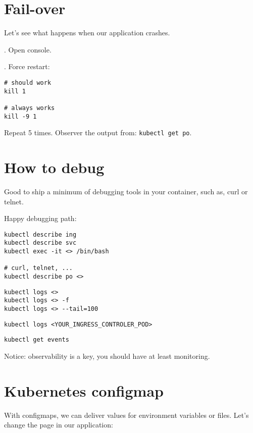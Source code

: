 \documentclass[12pt, letterpaper]{article}
\begin{document}
\bigskip
\bigskip

\section{Fail-over}
Let's see what happens when our application crashes.

. Open console.

. Force restart:

\begin{verbatim}
# should work
kill 1

# always works
kill -9 1
\end{verbatim}

Repeat 5 times. Observer the output from: \verb|kubectl get po|.

%
%
%
\section{How to debug}

Good to ship a minimum of debugging tools in your container, such as, curl or telnet.

Happy debugging path:

\begin{verbatim}
kubectl describe ing
kubectl describe svc
kubectl exec -it <> /bin/bash

# curl, telnet, ...
kubectl describe po <>
\end{verbatim}

\begin{verbatim}
kubectl logs <>
kubectl logs <> -f
kubectl logs <> --tail=100
\end{verbatim}

\begin{verbatim}
kubectl logs <YOUR_INGRESS_CONTROLER_POD>
\end{verbatim}

\begin{verbatim}
kubectl get events
\end{verbatim}

\bigskip
Notice: observability is a key, you should have at least monitoring.
%
%
%
\pagebreak
\section{Kubernetes configmap}

With configmaps, we can deliver values for environment variables or files. Let's change the page in our application:
\end{document}
